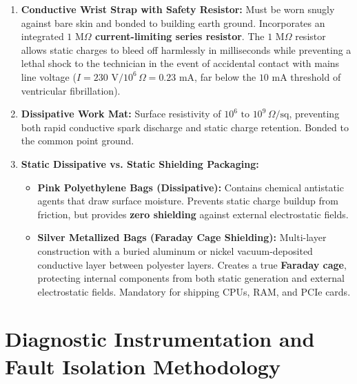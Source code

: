 \begin{keyconcept}
\begin{enumerate}[leftmargin=*]
    \item \textbf{Conductive Wrist Strap with Safety Resistor:} Must be worn snugly against bare skin and bonded to building earth ground. Incorporates an integrated \textbf{$1\text{ M}\Omega$ current-limiting series resistor}. The $1\text{ M}\Omega$ resistor allows static charges to bleed off harmlessly in milliseconds while preventing a lethal shock to the technician in the event of accidental contact with mains line voltage ($I = 230\text{ V} / 10^6\,\Omega = 0.23\text{ mA}$, far below the $10\text{ mA}$ threshold of ventricular fibrillation).
    \item \textbf{Dissipative Work Mat:} Surface resistivity of $10^6\text{ to }10^9\,\Omega/\text{sq}$, preventing both rapid conductive spark discharge and static charge retention. Bonded to the common point ground.
    \item \textbf{Static Dissipative vs. Static Shielding Packaging:}
    \begin{itemize}
        \item \textbf{Pink Polyethylene Bags (Dissipative):} Contains chemical antistatic agents that draw surface moisture. Prevents static charge buildup from friction, but provides \textbf{zero shielding} against external electrostatic fields.
        \item \textbf{Silver Metallized Bags (Faraday Cage Shielding):} Multi-layer construction with a buried aluminum or nickel vacuum-deposited conductive layer between polyester layers. Creates a true \textbf{Faraday cage}, protecting internal components from both static generation and external electrostatic fields. Mandatory for shipping CPUs, RAM, and PCIe cards.
    \end{itemize}
\end{enumerate}
\end{keyconcept}

\section{Diagnostic Instrumentation and Fault Isolation Methodology}

